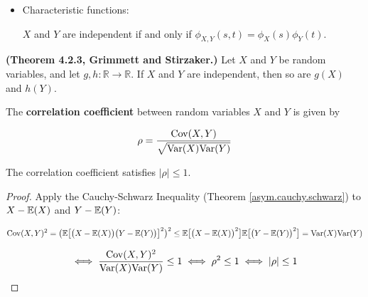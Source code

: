 \begin{itemize}
\begin{theorem}
\end{theorem}

\begin{proof} If the transformation from \(X_1, Y_1\) to \(X_2, Y_2\) is given by \(S(X_1, Y_1) = (X_2, Y_2)\), then the change of variables formula from calculus is as follows: 

\[
\int \int_{A} f_{X_1, Y_1} (x,y) dx dy = \int \int_{B} f_{X_1, Y_1} \big( S(x,y) \big) \left| J(x, y) \right| dx dy
\]

where \(A \subseteq \text{domain}(f_{X_1, Y_1}(\cdot))\), \(B\) is the transformation of the region \(A\) under \(S\), and \(|J(x,y)|\) is the Jacobian of \(S\) at \((x,y)\). It follows from the definition of joint pdfs that the integrand on the right is the joint pdf of \((X_2, Y_2)\); that is,

\[
f_{X_2, Y_2}(x,y) =  f_{X_1, Y_1} \big( S(x,y) \big) \left| J(x, y) \right| .
\]

\end{proof}






\item Characteristic functions: \begin{theorem}\(X\) and \(Y\) are independent if and only if \(\phi_{X,Y}(s,t) = \phi_X(s) \phi_Y(t)\).\end{theorem}

\end{itemize}

\begin{theorem} \textbf{(Theorem 4.2.3, Grimmett and Stirzaker.)} Let \(X\) and \(Y\) be random variables, and let \(g, h: \mathbb{R} \to \mathbb{R}\). If \(X\) and \(Y\) are independent, then so are \(g(X)\) and \(h(Y)\). \end{theorem}

\begin{definition}The \textbf{correlation coefficient} between random variables \(X\) and \(Y\) is given by

\[
\rho = \frac{\mathrm{Cov}(X,Y)}{\sqrt{\mathrm{Var}(X) \mathrm{Var}(Y)}}
\]
\end{definition}

\begin{theorem}The correlation coefficient satisfies \(|\rho| \leq 1\).\end{theorem}

\begin{proof}
Apply the Cauchy-Schwarz Inequality (Theorem \ref{asym.cauchy.schwarz})  to \(X - \mathbb{E}(X)\) and \(Y - \mathbb{E}(Y)\):

\[
\mathrm{Cov}(X,Y)^2 = \big(\mathbb{E}\big[\big(X - \mathbb{E}(X) \big) \big(Y - \mathbb{E}(Y) \big) \big]^2\big)^2 \leq \mathbb{E} \big[\big(X - \mathbb{E}(X) \big)^2 \big]\mathbb{E} \big[ \big(Y - \mathbb{E}(Y) \big) ^2\big] = \mathrm{Var}(X) \mathrm{Var}(Y) 
\]

\[
\iff \frac{\mathrm{Cov}(X,Y)^2}{\mathrm{Var}(X) \mathrm{Var}(Y) } \leq 1 \iff \rho^2 \leq 1 \iff |\rho| \leq 1
\]

\end{proof}

